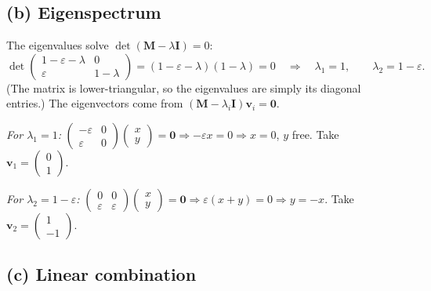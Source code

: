 \documentclass[12pt,a4paper]{article}
\theoremstyle{definition}
\newcommand{\Mx}{\mathbf{M}}
\newcommand{\vv}{\mathbf{v}}
\newcommand{\zero}{\mathbf{0}}
\begin{document}
\subsection{(b) Eigenspectrum}

The eigenvalues solve $\det(\Mx-\lambda \mathbf I)=0$:
\[
\det\!\begin{pmatrix}1-\varepsilon-\lambda & 0\\[2pt] \varepsilon & 1-\lambda\end{pmatrix}
=(1-\varepsilon-\lambda)(1-\lambda)=0
\quad\Longrightarrow\quad
\boxed{\lambda_1=1,\qquad \lambda_2=1-\varepsilon.}
\]
(The matrix is lower-triangular, so the eigenvalues are simply its diagonal
entries.) The eigenvectors come from $(\Mx-\lambda_i\mathbf I)\vv_i=\zero$.

\textit{For $\lambda_1=1$:}\quad
$\begin{pmatrix}-\varepsilon & 0\\ \varepsilon & 0\end{pmatrix}\!\begin{pmatrix}x\\ y\end{pmatrix}=\zero
\Rightarrow -\varepsilon x=0\Rightarrow x=0$, $y$ free. Take
$\displaystyle \vv_1=\begin{pmatrix}0\\1\end{pmatrix}.$

\textit{For $\lambda_2=1-\varepsilon$:}\quad
$\begin{pmatrix}0 & 0\\ \varepsilon & \varepsilon\end{pmatrix}\!\begin{pmatrix}x\\ y\end{pmatrix}=\zero
\Rightarrow \varepsilon(x+y)=0\Rightarrow y=-x$. Take
$\displaystyle \vv_2=\begin{pmatrix}1\\-1\end{pmatrix}.$

\subsection{(c) Linear combination}
\end{document}
